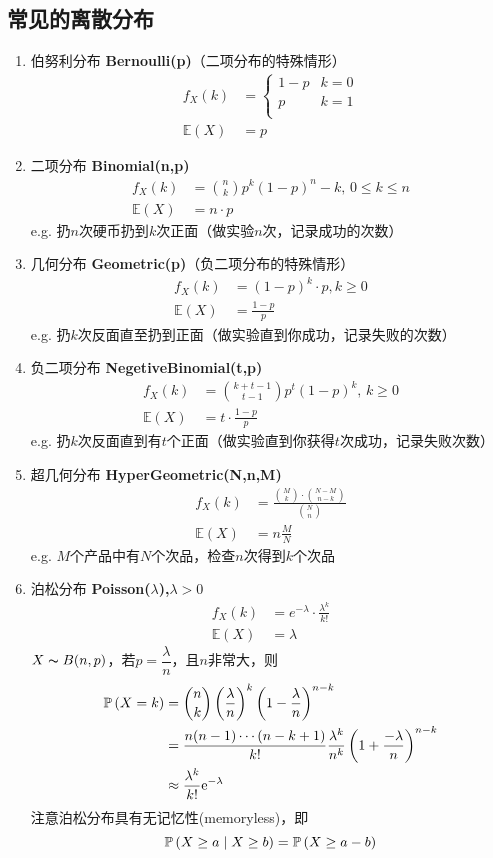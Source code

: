 \subsection{常见的离散分布}
\begin{enumerate}
	\item 伯努利分布 \textbf{Bernoulli(p)}（二项分布的特殊情形）
		\[\begin{aligned}
		f_{X}(k)&=\begin{cases}
		1-p & k=0\\
		p & k=1\\
		\end{cases}\\
		\mathbb{E}(X)&=p
		\end{aligned}\]
	\item 二项分布 \textbf{Binomial(n,p)}
		\[\begin{aligned}
		f_{X}(k)& =\binom{n}{k}p^k(1-p)^n-k,\,0\leq k\leq n\\
		\mathbb{E}(X)& =n\cdot p
		\end{aligned}\]
		e.g. 扔$n$次硬币扔到$k$次正面（做实验$n$次，记录成功的次数）
	\item 几何分布 \textbf{Geometric(p)}（负二项分布的特殊情形）
		\[\begin{aligned}
		f_{X}(k)& =(1-p)^k\cdot p,k\geq 0\\
		\mathbb{E}(X)& =\frac{1-p}{p}
		\end{aligned}\]
		e.g. 扔$k$次反面直至扔到正面（做实验直到你成功，记录失败的次数）
	\item 负二项分布 \textbf{NegetiveBinomial(t,p)}
		\[\begin{aligned}
		f_{X}(k)& =\binom{k+t-1}{t-1}p^t(1-p)^k,\,k\geq 0\\
		\mathbb{E}(X)& =t\cdot\frac{1-p}{p}
		\end{aligned}\]
		e.g. 扔$k$次反面直到有$t$个正面（做实验直到你获得$t$次成功，记录失败次数）
	\item 超几何分布 \textbf{HyperGeometric(N,n,M)}
		\[\begin{aligned}
		f_{X}(k)& =\frac{\binom{M}{k}\cdot \binom{N-M}{n-k}}{\binom{N}{n}}\\
		\mathbb{E}(X)& =n\frac{M}{N}
		\end{aligned}\]
		e.g. $M$个产品中有$N$个次品，检查$n$次得到$k$个次品
	\item 泊松分布 \textbf{Poisson($\lambda$),$\lambda>0$}
		\[\begin{aligned}
		f_{X}(k)& =e^{-\lambda}\cdot \frac{\lambda^k}{k!}\\
		\mathbb{E}(X)& =\lambda
		\end{aligned}\]
		$X\thicksim B(n,p)$，若$p=\dfrac{\lambda}{n}$，且$n$非常大，则
		\[\begin{aligned}
		\mathbb{P}\left(X=k\right) &= \binom{n}{k}\left(\frac{\lambda}{n}\right)^k\left(1-\frac{\lambda}{n}\right)^{n-k}\\
		&= \frac{n(n-1)\cdots(n-k+1)}{k!}\frac{\lambda^k}{n^k}\left(1+\frac{-\lambda}{n}\right)^{n-k}\\
		&\approx \frac{\lambda^k}{k!}\mathrm{e}^{-\lambda}
		\end{aligned}\]
		注意泊松分布具有无记忆性(memoryless)，即
		\[\mathbb{P}\left(X\geq a\mid X\geq b\right)=\mathbb{P}\left(X\geq a-b\right)\]
\end{enumerate}

